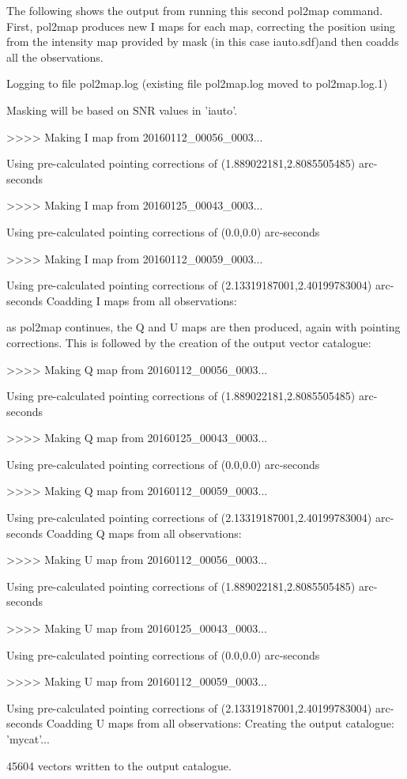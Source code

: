 The following shows the output from running this second pol2map
command. First, pol2map produces new I maps for each map, correcting
the position using from the intensity map provided by mask (in this
case iauto.sdf)and then coadds all the observations.

\begin{terminalv}
Logging to file pol2map.log
(existing file pol2map.log moved to pol2map.log.1)

Masking will be based on SNR values in 'iauto'.

>>>>   Making I map from 20160112_00056_0003...

   Using pre-calculated pointing corrections of (1.889022181,2.8085505485) arc-seconds

>>>>   Making I map from 20160125_00043_0003...

   Using pre-calculated pointing corrections of (0.0,0.0) arc-seconds

>>>>   Making I map from 20160112_00059_0003...

   Using pre-calculated pointing corrections of (2.13319187001,2.40199783004) arc-seconds
Coadding I maps from all observations:
\end{terminalv}

as pol2map continues, the Q and U maps are then produced, again with
pointing corrections. This is followed by the creation of the output
vector catalogue:

\begin{terminalv}
>>>>   Making Q map from 20160112_00056_0003...

   Using pre-calculated pointing corrections of (1.889022181,2.8085505485) arc-seconds

>>>>   Making Q map from 20160125_00043_0003...

   Using pre-calculated pointing corrections of (0.0,0.0) arc-seconds

>>>>   Making Q map from 20160112_00059_0003...

   Using pre-calculated pointing corrections of (2.13319187001,2.40199783004) arc-seconds
Coadding Q maps from all observations:

>>>>   Making U map from 20160112_00056_0003...

   Using pre-calculated pointing corrections of (1.889022181,2.8085505485) arc-seconds

>>>>   Making U map from 20160125_00043_0003...

   Using pre-calculated pointing corrections of (0.0,0.0) arc-seconds

>>>>   Making U map from 20160112_00059_0003...

   Using pre-calculated pointing corrections of (2.13319187001,2.40199783004) arc-seconds
Coadding U maps from all observations:
Creating the output catalogue: 'mycat'...

45604 vectors written to the output catalogue.
\end{terminalv}


